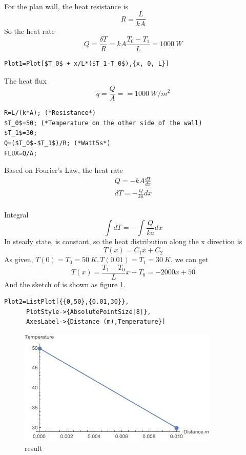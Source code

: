 \begin{solution}
~\\
For the plan wall, the heat resistance is
$$R=\frac{L}{kA}$$
So the heat rate 
$$
Q=\frac{\delta T}{R}=kA\frac{T_0-T_1}{L}=1000~W
$$

\begin{lstlisting}
Plot1=Plot[$T_0$ + x/L*($T_1-T_0$),{x, 0, L}]
\end{lstlisting}
The heat flux$$q=\frac{Q}{A}==1000~W/m^2$$
\begin{lstlisting}
R=L/(k*A); (*Resistance*)
$T_0$=50; (*Temperature on the other side of the wall)
$T_1$=30;
Q=($T_0$-$T_1$)/R; (*Watt5s*)
FLUX=Q/A;
\end{lstlisting}
Based on Fourier’s Law, the heat rate
\begin{eqnarray*}
Q=-kA\frac{dT}{dx}\\
dT=-\frac{Q}{ka}dx
\end{eqnarray*}
~\\
Integral
$$\int dT=-\int \frac{Q}{ka} dx$$
In steady state,  is constant, so the heat distribution along the x direction is
$$T(x)=C_1x+C_2$$
As given, $T(0)=T_0=50~K, T(0.01)=T_1=30~K$, we can get
$$T(x)=\frac{T_1-T_0}{L}x+T_0=-2000x+50$$
And the sketch of  is shown as figure \ref{fig:2:2}.
\begin{lstlisting}
Plot2=ListPlot[{{0,50},{0.01,30}},
      PlotStyle->{AbsolutePointSize[8]},
      AxesLabel->{Distance (m),Temperature}]
\end{lstlisting}

\begin{figure}[h!]
  \centering
    \includegraphics[scale=0.8]{figures/ch2/2}
    \caption{result}
    \label{fig:2:2}
\end{figure}
\end{solution}

